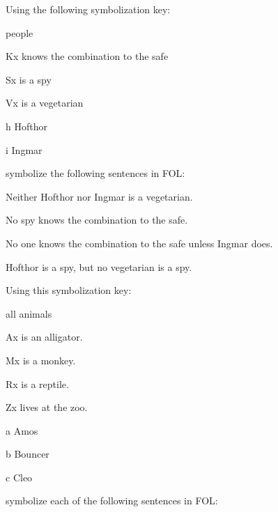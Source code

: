 \problempart
\label{pr.FOLvegetarians}
Using the following symbolization key:
\begin{ekey}
\item[\text{domain}] people
\item[Kx]  knows the combination to the safe
\item[Sx]  is a spy
\item[Vx]  is a vegetarian
\item[h] Hofthor
\item[i] Ingmar
\end{ekey}
symbolize the following sentences in FOL:
\begin{earg}
\item Neither Hofthor nor Ingmar is a vegetarian.
\item No spy knows the combination to the safe.
\item No one knows the combination to the safe unless Ingmar does.
\item Hofthor is a spy, but no vegetarian is a spy.
\end{earg}
\solutions
\problempart\label{pr.FOLalligators}
Using this symbolization key:
\begin{ekey}
\item[\text{domain}] all animals
\item[Ax]  is an alligator.
\item[Mx]  is a monkey.
\item[Rx]  is a reptile.
\item[Zx]  lives at the zoo.
\item[a] Amos
\item[b] Bouncer
\item[c] Cleo
\end{ekey}
symbolize each of the following sentences in FOL:
